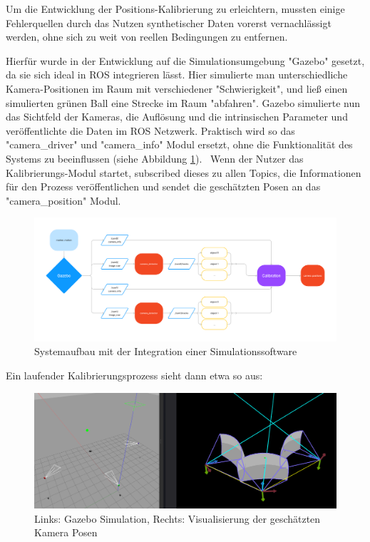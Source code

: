 \documentclass[12pt, ngerman]{article}
\begin{document}
Um die Entwicklung der Positions-Kalibrierung zu erleichtern, mussten einige Fehlerquellen durch das Nutzen synthetischer Daten vorerst vernachlässigt werden, ohne sich zu weit von reellen Bedingungen zu entfernen. 

Hierfür wurde in der Entwicklung auf die Simulationsumgebung "Gazebo" gesetzt, da sie sich ideal in ROS integrieren lässt. Hier simulierte man unterschiedliche Kamera-Positionen im Raum mit verschiedener "Schwierigkeit", und ließ einen simulierten grünen Ball eine Strecke im Raum "abfahren". Gazebo simulierte nun das Sichtfeld der Kameras, die Auflösung und die intrinsischen Parameter und veröffentlichte die Daten im ROS Netzwerk. Praktisch wird so das "camera\_driver" und "camera\_info" Modul ersetzt, ohne die Funktionalität des Systems zu beeinflussen (siehe Abbildung \ref{Abb: calibration-aufbau}). 
Wenn der Nutzer das Kalibrierungs-Modul startet, subscribed dieses zu allen Topics, die Informationen für den Prozess veröffentlichen und sendet die geschätzten Posen an das "camera\_position" Modul.

\begin{figure}[hbtp!]
    \includegraphics[width=\textwidth]{anytrack-calibration.png}
    \caption{Systemaufbau mit der Integration einer Simulationssoftware}
    \label{Abb: calibration-aufbau}
\end{figure}
Ein laufender Kalibrierungsprozess sieht dann etwa so aus:
\vspace{5pt}
\begin{figure}[hbtp!]
    \includegraphics[width=\textwidth]{simulation_calibration-2.png}
    \caption{Links: Gazebo Simulation, Rechts: Visualisierung der geschätzten Kamera Posen}
    \label{Abb: simulation-calibration}
\end{figure}
\end{document}
